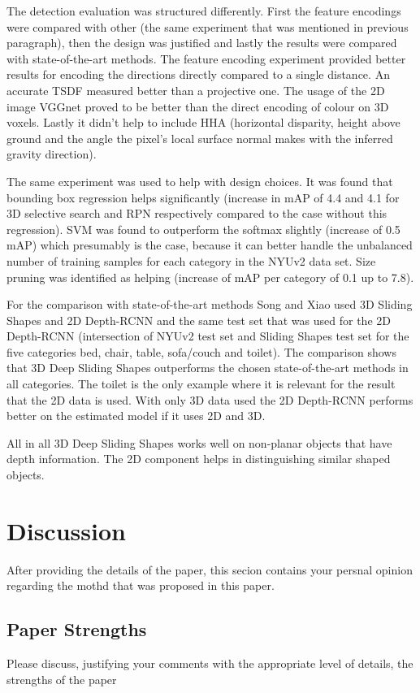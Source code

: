 \documentclass[12pt]{scrartcl}
\begin{document}
The detection evaluation was structured differently. First the feature encodings
were compared with other (the same experiment that was mentioned in previous
paragraph), then the design was justified and lastly the results were compared
with state-of-the-art methods. The feature encoding experiment provided better
results for encoding the directions directly compared to a single distance.
An accurate TSDF measured better than a projective one. The usage of the 2D image
VGGnet proved to be better than the direct encoding of colour on 3D voxels.
Lastly it didn't help to include HHA (horizontal disparity, height above ground
and the angle the pixel's local surface normal makes with the inferred gravity
direction).

The same experiment was used to help with design choices. It was found that
bounding box regression helps significantly (increase in mAP of 4.4 and 4.1
for 3D selective search and RPN respectively compared to the case without this
regression). SVM was found to outperform the softmax slightly (increase of 0.5 mAP)
which presumably is the case, because it can better handle the unbalanced number of
training samples for each category in the NYUv2 data set. Size pruning was identified
as helping (increase of mAP per category of 0.1 up to 7.8).

For the comparison with state-of-the-art methods Song and Xiao used 3D Sliding
Shapes\cite{Song2014} and 2D Depth-RCNN\cite{Gupta2015} and the same test set
that was used for the 2D Depth-RCNN (intersection of NYUv2 test set and Sliding
Shapes test set for the five categories bed, chair, table, sofa/couch and toilet).
The comparison shows that 3D Deep Sliding Shapes outperforms the chosen state-of-the-art
methods in all categories. The toilet is the only example where it is relevant
for the result that the 2D data is used. With only 3D data used the 2D Depth-RCNN
performs better on the estimated model if it uses 2D and 3D.

All in all 3D Deep Sliding Shapes works well on non-planar objects that have depth
information. The 2D component helps in distinguishing similar shaped objects.

\section{Discussion} %
\label{sec:discussion}
After providing the details of the paper, this secion contains your persnal opinion regarding the mothd that was proposed in this paper.
\subsection{Paper Strengths} %
\label{sub:paper_strengths}
Please discuss, justifying your comments with the appropriate level of details, the strengths of the paper
\end{document}
